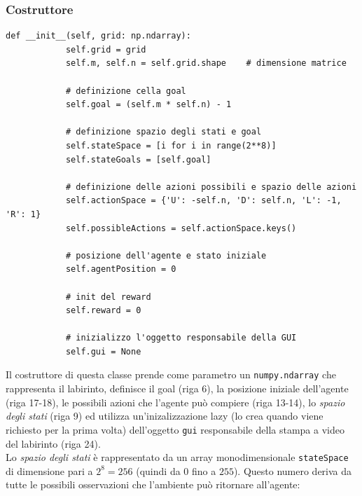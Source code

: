 \subsubsection{Costruttore}

\begin{lstlisting}[style=python, caption={Costruttore di MazeEnv.py}]
    def __init__(self, grid: np.ndarray):
			self.grid = grid
			self.m, self.n = self.grid.shape    # dimensione matrice
			
			# definizione cella goal
			self.goal = (self.m * self.n) - 1
			
			# definizione spazio degli stati e goal
			self.stateSpace = [i for i in range(2**8)]
			self.stateGoals = [self.goal]
			
			# definizione delle azioni possibili e spazio delle azioni
			self.actionSpace = {'U': -self.n, 'D': self.n, 'L': -1, 'R': 1}
			self.possibleActions = self.actionSpace.keys()
			
			# posizione dell'agente e stato iniziale
			self.agentPosition = 0
			
			# init del reward
			self.reward = 0
			
			# inizializzo l'oggetto responsabile della GUI
			self.gui = None
\end{lstlisting}

Il costruttore di questa classe prende come parametro un \lstinline[style=cmd]|numpy.ndarray| che rappresenta il labirinto, definisce il goal (riga 6), la posizione iniziale dell'agente (riga 17-18), le possibili azioni che l'agente pu\`{o} compiere (riga 13-14), lo \textit{spazio degli stati} (riga 9) ed utilizza un'inizalizzazione lazy (lo crea quando viene richiesto per la prima volta) dell'oggetto \lstinline[style=cmd]|gui| responsabile della stampa a video del labirinto (riga 24). \\

Lo \textit{spazio degli stati} \`{e} rappresentato da un array monodimensionale \lstinline[style=cmd]|stateSpace| di dimensione pari a $2^8 = 256$ (quindi da $0$ fino a $255$). Questo numero deriva da tutte le possibili osservazioni che l'ambiente pu\`{o} ritornare all'agente:

